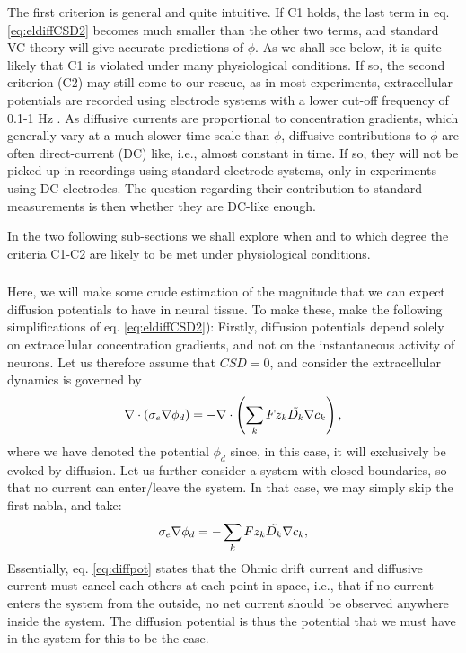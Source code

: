 The first criterion is general and quite intuitive. If C1 holds, the last term in eq. \ref{eq:eldiffCSD2} becomes much smaller than the other two terms, and standard VC theory will give accurate predictions of $\phi$. As we shall see below, it is quite likely that C1 is violated under many physiological conditions. If so, the second criterion (C2) may still come to our rescue, as in most experiments, extracellular potentials are recorded using electrode systems with a lower cut-off frequency of 0.1-1 Hz \cite{Einevoll2007}. As diffusive currents are proportional to concentration gradients, which generally vary at a much slower time scale than $\phi$, diffusive contributions to $\phi$ are often direct-current (DC) like, i.e., almost constant in time. If so, they will not be picked up in recordings using standard electrode systems, only in experiments using DC electrodes. The question regarding their contribution to standard measurements is then whether they are DC-like enough. 

In the two following sub-sections we shall explore when and to which degree the criteria C1-C2 are likely to be met under physiological conditions.

\subsubsection{}
Here, we will make some crude estimation of the magnitude that we can expect diffusion potentials to have in neural tissue. To make these, make the following simplifications of eq. \ref{eq:eldiffCSD2}): Firstly, diffusion potentials depend solely on extracellular concentration gradients, and not on the instantaneous activity of neurons. Let us therefore assume that $CSD = 0$, and consider the extracellular dynamics is governed by
\begin{equation}
\nabla \cdot (\sigma_e\nabla\phi_d) = - \nabla \cdot \left (\sum_k{F z_k \tilde{D_k}{\bf \nabla} c_{k}} \right), 
\label{eq:eldiffCSD3}
\end{equation}
where we have denoted the potential $\phi_d$ since, in this case, it will exclusively be evoked by diffusion. Let us further consider a system with closed boundaries, so that no current can enter/leave the system. In that case, we may simply skip the first nabla, and take:
\begin{equation}
\sigma_e\nabla\phi_d = -\sum_k{F z_k \tilde{D_k}{\bf \nabla} c_{k}}, 
\label{eq:diffpot}
\end{equation}
Essentially, eq. \ref{eq:diffpot} states that the Ohmic drift current and diffusive current must cancel each others at each point in space, i.e., that if no current enters the system from the outside, no net current should be observed anywhere inside the system. The diffusion potential is thus the potential that we must have in the system for this to be the case. 

